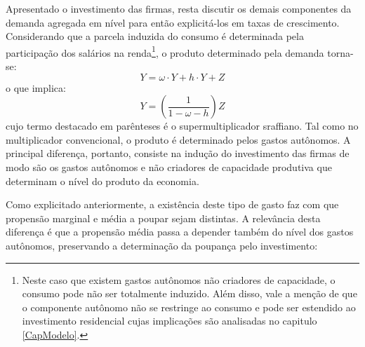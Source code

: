 Apresentado o investimento das firmas, resta discutir os demais componentes da demanda agregada em nível para então explicitá-los em taxas de crescimento.
Considerando que a parcela induzida do consumo é determinada pela participação dos salários  na renda\footnote{Neste caso que existem gastos autônomos não criadores de capacidade, o consumo pode não ser totalmente induzido. Além disso, vale a menção de que o componente autônomo não se restringe ao consumo e pode ser estendido ao investimento residencial cujas implicações são analisadas no capitulo \ref{CapModelo}.}, o produto determinado pela demanda torna-se:
\begin{equation}
\label{PIBSuper}
Y = \omega\cdot Y + h\cdot Y + Z
\end{equation}
o que implica:
\begin{equation}
\label{Supermultiplicador}
Y = \left(\frac{1}{1 - \omega - h}\right)Z
\end{equation}
cujo termo destacado em parênteses é o supermultiplicador sraffiano. Tal como no multiplicador convencional, o produto é determinado pelos gastos autônomos.
A principal diferença, portanto, consiste
na indução do investimento das firmas de modo são os gastos autônomos e não criadores de capacidade produtiva que determinam o nível do produto da economia.


Como explicitado anteriormente, a existência deste tipo de gasto faz com que propensão marginal e média a poupar sejam distintas. A relevância desta diferença é que a propensão média passa a depender também do nível dos gastos autônomos, preservando a determinação da poupança pelo investimento:


